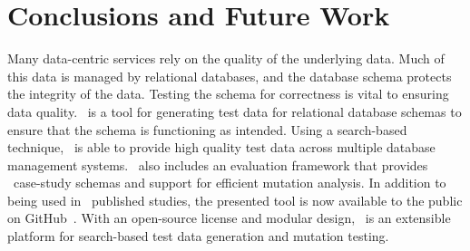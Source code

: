 \section{Conclusions and Future Work}\label{sec:conclusion}

Many data-centric services rely on the quality of the underlying data. Much of this data is managed by relational
databases, and the database schema protects the integrity of the data.  Testing the schema for correctness is vital to
ensuring data quality. \sa~is a tool for generating test data for relational database schemas to ensure that the schema
is functioning as intended. Using a search-based technique, \sa~is able to provide high quality test data across
multiple database management systems. \sa~also includes an evaluation framework that provides
\numprovidedschemas~case-study schemas and support for efficient mutation analysis. In addition to being used in
\numuniquepapers~published studies, the presented tool is now available to the public on GitHub~\cite{tool}. With an
open-source license and modular design, \sa~is an extensible platform for search-based test data generation and mutation
testing.
